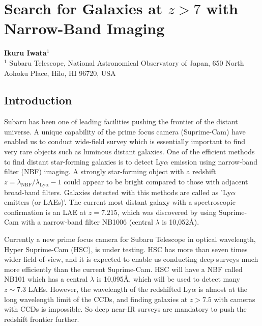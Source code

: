 \def\thisdir{science/veryhighz/}


\section{Search for Galaxies at $z>7$ with Narrow-Band Imaging
\label{sec:nbf}}

\noindent
\begin{center}
{\bf Ikuru Iwata$^{1}$}\\
$^1$ Subaru Telescope, National Astronomical Observatory of Japan, 650
North Aohoku Place, Hilo, HI 96720, USA
\end{center}
\vspace{0.5cm}

\subsection{Introduction}

Subaru has been one of leading facilities pushing the frontier of
the distant universe. A unique capability of the prime focus camera
(Suprime-Cam) have enabled us to conduct wide-field survey which is
essentially important to find very rare objects such as luminous distant
galaxies. One of the efficient methods to find distant star-forming
galaxies is to detect Ly$\alpha$ emission using narrow-band filter (NBF) 
imaging. A strongly star-forming object with a redshift 
$z = \lambda_\mathrm{NBF} / \lambda_\mathrm{Ly\alpha} -1$ could
appear to be bright compared to those with adjacent broad-band
filters. Galaxies detected with this methods are called as 'Ly$\alpha$
emitters (or LAEs)'. The current most distant galaxy with a spectroscopic 
confirmation is an LAE at $z=7.215$, which was discovered by
\citet{Shibuya2012} using Suprime-Cam with a narrow-band filter NB1006
(central $\lambda$ is 10,052\AA).

Currently a new prime focus camera for Subaru Telescope in optical
wavelength, Hyper Suprime-Cam (HSC), is under testing. HSC has more than
seven times wider field-of-view, and it is expected to enable us
conducting deep surveys much more efficiently than the current
Suprime-Cam. HSC will have a NBF called NB101 which has a central
$\lambda$ is 10,095\AA, which will be used to detect many $z\sim 7.3$
LAEs. 
However, the wavelength of the redshifted Ly$\alpha$ is almost at the
long wavelength limit of the CCDs, and finding galaxies at $z>7.5$ with
cameras with CCDs is impossible. So deep near-IR surveys are mandatory
to push the redshift frontier further.


